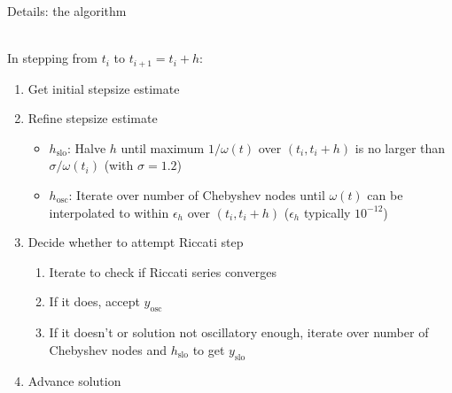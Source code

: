 \documentclass{beamer}
\numberwithin{equation}{theorem}
\begin{document}
\begin{noframe}
    \begin{minipage}{0.5\textwidth}
    Details: the algorithm \\ 
    \vphantom{.} \\
    {\scriptsize
    In stepping from $t_i$ to $t_{i+1} = t_i + h$:
    \begin{enumerate}
        \item Get initial stepsize estimate
        \item Refine stepsize estimate
        \begin{itemize}
            \item \scriptsize $h_{\text{slo}}$: Halve $h$ until maximum $1/\omega(t)$ over $(t_i, t_i +h)$ is no larger than $\sigma/\omega(t_i)$ (with $\sigma = 1.2$)
            \item  \scriptsize$h_{\text{osc}}$: Iterate over number of Chebyshev nodes until $\omega(t)$ can be interpolated to within $\epsilon_h$ over $(t_i, t_i+h)$ ($\epsilon_h$ typically $10^{-12}$)
        \end{itemize}
        \item Decide whether to attempt Riccati step
        \begin{enumerate}
            \item \scriptsize Iterate to check if Riccati series converges
            \item \scriptsize If it does, accept $y_{\text{osc}}$
            \item \scriptsize If it doesn't or solution not oscillatory enough, iterate over number of Chebyshev nodes and $h_{\text{slo}}$ to get $y_{\text{slo}}$ 
        \end{enumerate}
        \item Advance solution
    \end{enumerate}
    }
    \end{minipage}\hfill
    \begin{minipage}{0.5\textwidth}
\end{minipage}
\end{noframe}
\end{document}
